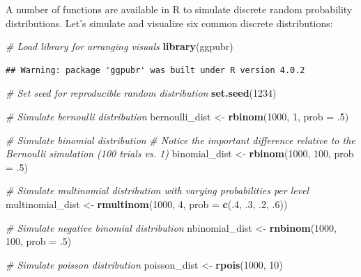 \documentclass[]{book}
\newenvironment{Shaded}{\begin{snugshade}}{\end{snugshade}}
\newcommand{\CommentTok}[1]{\textcolor[rgb]{0.56,0.35,0.01}{\textit{#1}}}
\newcommand{\DataTypeTok}[1]{\textcolor[rgb]{0.13,0.29,0.53}{#1}}
\newcommand{\DecValTok}[1]{\textcolor[rgb]{0.00,0.00,0.81}{#1}}
\newcommand{\FloatTok}[1]{\textcolor[rgb]{0.00,0.00,0.81}{#1}}
\newcommand{\KeywordTok}[1]{\textcolor[rgb]{0.13,0.29,0.53}{\textbf{#1}}}
\newcommand{\NormalTok}[1]{#1}
\newcommand{\StringTok}[1]{\textcolor[rgb]{0.31,0.60,0.02}{#1}}
\begin{document}
A number of functions are available in R to simulate discrete random probability distributions. Let's simulate and visualize six common discrete distributions:

\begin{Shaded}
\begin{Highlighting}[]
\CommentTok{# Load library for arranging visuals}
\KeywordTok{library}\NormalTok{(ggpubr)}
\end{Highlighting}
\end{Shaded}

\begin{verbatim}
## Warning: package 'ggpubr' was built under R version 4.0.2
\end{verbatim}

\begin{Shaded}
\begin{Highlighting}[]
\CommentTok{# Set seed for reproducible random distribution}
\KeywordTok{set.seed}\NormalTok{(}\DecValTok{1234}\NormalTok{)}

\CommentTok{# Simulate bernoulli distribution}
\NormalTok{bernoulli_dist <-}\StringTok{ }\KeywordTok{rbinom}\NormalTok{(}\DecValTok{1000}\NormalTok{, }\DecValTok{1}\NormalTok{, }\DataTypeTok{prob =} \FloatTok{.5}\NormalTok{)}

\CommentTok{# Simulate binomial distribution}
\CommentTok{# Notice the important difference relative to the Bernoulli simulation (100 trials vs. 1)}
\NormalTok{binomial_dist <-}\StringTok{ }\KeywordTok{rbinom}\NormalTok{(}\DecValTok{1000}\NormalTok{, }\DecValTok{100}\NormalTok{, }\DataTypeTok{prob =} \FloatTok{.5}\NormalTok{) }

\CommentTok{# Simulate multinomial distribution with varying probabilities per level}
\NormalTok{multinomial_dist <-}\StringTok{ }\KeywordTok{rmultinom}\NormalTok{(}\DecValTok{1000}\NormalTok{, }\DecValTok{4}\NormalTok{, }\DataTypeTok{prob =} \KeywordTok{c}\NormalTok{(.}\DecValTok{4}\NormalTok{, }\FloatTok{.3}\NormalTok{, }\FloatTok{.2}\NormalTok{, }\FloatTok{.6}\NormalTok{))}

\CommentTok{# Simulate negative binomial distribution}
\NormalTok{nbinomial_dist <-}\StringTok{ }\KeywordTok{rnbinom}\NormalTok{(}\DecValTok{1000}\NormalTok{, }\DecValTok{100}\NormalTok{, }\DataTypeTok{prob =} \FloatTok{.5}\NormalTok{) }

\CommentTok{# Simulate poisson distribution}
\NormalTok{poisson_dist <-}\StringTok{ }\KeywordTok{rpois}\NormalTok{(}\DecValTok{1000}\NormalTok{, }\DecValTok{10}\NormalTok{) }


\end{Highlighting}
\end{Shaded}
\end{document}
